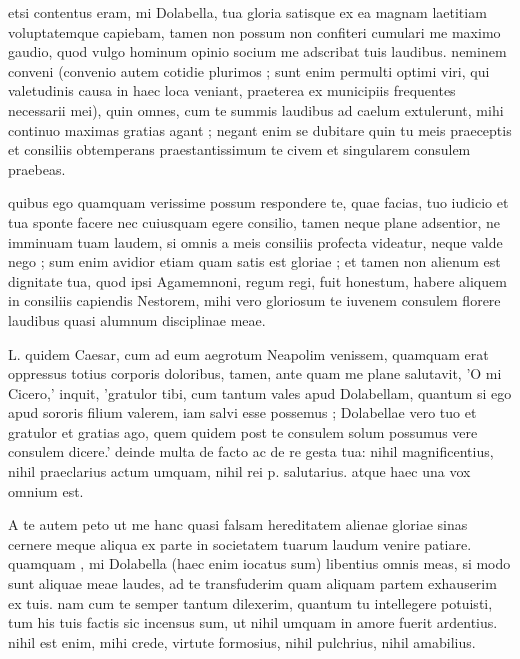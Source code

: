 


 etsi contentus eram, mi Dolabella, tua gloria satisque ex ea magnam laetitiam voluptatemque capiebam, tamen non possum non confiteri cumulari me maximo gaudio, quod vulgo hominum opinio socium me adscribat tuis laudibus. neminem conveni (convenio autem cotidie plurimos ; sunt enim permulti optimi viri, qui valetudinis causa in haec loca veniant, praeterea ex municipiis frequentes necessarii mei), quin omnes, cum te summis laudibus ad caelum extulerunt, mihi continuo maximas gratias agant ; negant enim se dubitare quin tu meis praeceptis et consiliis obtemperans praestantissimum te civem et singularem consulem praebeas.

 quibus ego quamquam verissime possum respondere te, quae facias, tuo iudicio et tua sponte facere nec cuiusquam egere consilio, tamen neque plane adsentior, ne imminuam tuam laudem, si omnis a meis consiliis profecta videatur, neque valde nego ; sum enim avidior etiam quam satis est gloriae ; et tamen non alienum est dignitate tua, quod ipsi Agamemnoni, regum regi, fuit honestum, habere aliquem in consiliis capiendis Nestorem, mihi vero gloriosum te iuvenem consulem florere laudibus quasi alumnum disciplinae meae.

 L. quidem Caesar, cum ad eum aegrotum Neapolim venissem, quamquam erat oppressus totius corporis doloribus, tamen, ante quam me plane salutavit, 'O mi Cicero,' inquit, 'gratulor tibi, cum tantum vales apud Dolabellam, quantum si ego apud sororis filium valerem, iam salvi esse possemus ; Dolabellae vero tuo et gratulor et gratias ago, quem quidem post te consulem solum possumus vere consulem dicere.' deinde multa de facto ac de re gesta tua: nihil magnificentius, nihil praeclarius actum umquam, nihil rei p. salutarius. atque haec una vox omnium est.

 A te autem peto ut me hanc quasi falsam hereditatem alienae gloriae sinas cernere meque aliqua ex parte in societatem tuarum laudum venire patiare. quamquam , mi Dolabella (haec enim iocatus sum) libentius omnis meas, si modo sunt aliquae meae laudes, ad te transfuderim quam aliquam partem exhauserim ex tuis. nam cum te semper tantum dilexerim, quantum tu intellegere potuisti, tum his tuis factis sic incensus sum, ut nihil umquam in amore fuerit ardentius. nihil est enim, mihi crede, virtute formosius, nihil pulchrius, nihil amabilius.

